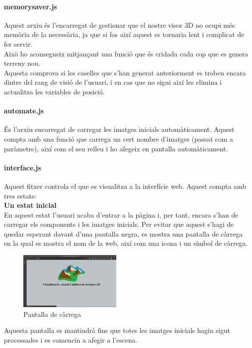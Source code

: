 ﻿\documentclass[10pt,a4paper,twocolumn,twoside]{article}
\begin{document}
\paragraph{memorysaver.js}
Aquest arxiu és l'encarregat de gestionar que el nostre visor 3D no ocupi més memòria de la necessària, ja que si fos així aquest es tornaria lent i complicat de fer servir.\\Això ho aconsegueix mitjançant una funció que és cridada cada cop que es genera terreny nou.\\

Aquesta comprova si les caselles que s'han generat anteriorment es troben encara dintre del rang de visió de l'usuari, i en cas que no sigui així les elimina i actualitza les variables de posició.
\paragraph{automate.js}
És l'arxiu encarregat de carregar les imatges inicials automàticament. Aquest compta amb una funció que carrega un cert nombre d'imatges (passat com a paràmetre), així com el seu relleu i ho afegeix en pantalla automàticament.

\paragraph{interface.js}
Aquest fitxer controla el que es visualitza a la interfície web. Aquest compta amb tres estats:\\
\textbf{Un estat inicial}\\
En aquest estat l'usuari acaba d'entrar a la pàgina i, per tant, encara s'han de carregar els components i les imatges inicials. Per evitar que aquest s'hagi de quedar esperant davant d'una pantalla negra, es mostra una pantalla de càrrega en la qual es mostra el nom de la web, així com una icona i un símbol de càrrega.
\begin{figure}[H]
\centering
\includegraphics[width=0.45\textwidth]{img/loadingScreen.png}
\caption{Pantalla de càrrega}
\end{figure}
Aquesta pantalla es mantindrà fins que totes les imatges inicials hagin sigut processades i es comencin a afegir a l'escena.\\
\end{document}
